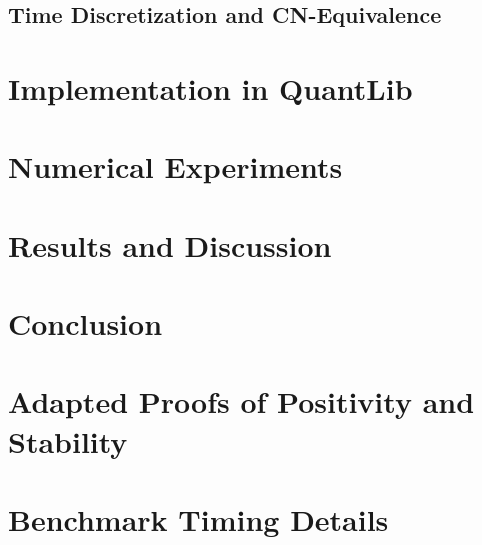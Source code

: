 \documentclass[11pt]{article}
\theoremstyle{definition}
\theoremstyle{remark}
\begin{document}
\subsection{Time Discretization and CN-Equivalence}
\label{sec:time}


\section{Implementation in QuantLib}
\label{sec:impl}


\section{Numerical Experiments}
\label{sec:experiments}


\section{Results and Discussion}
\label{sec:results}


\section{Conclusion}
\label{sec:conclusion}


\appendix

\section{Adapted Proofs of Positivity and Stability}
\label{app:proofs}


\section{Benchmark Timing Details}
\label{app:benchmark}



\end{document}
